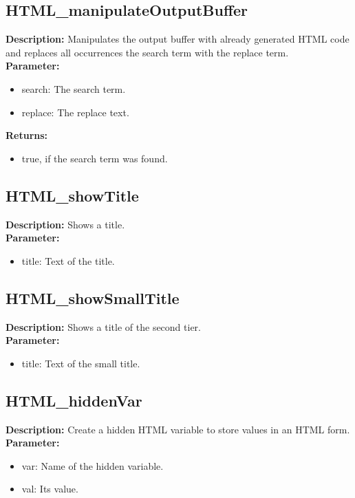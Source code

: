\subsection{HTML\_manipulateOutputBuffer}
\textbf{Description:} Manipulates the output buffer with already generated HTML code and replaces all occurrences the search term with the replace term.\\
\textbf{Parameter:}
\begin{itemize}
\item search: The search term.
\item replace: The replace text.
\end{itemize}
\textbf{Returns:}
\begin{itemize}
\item true, if the search term was found.
\end{itemize}

\subsection{HTML\_showTitle}
\textbf{Description:} Shows a title.\\
\textbf{Parameter:}
\begin{itemize}
\item title: Text of the title.
\end{itemize}

\subsection{HTML\_showSmallTitle}
\textbf{Description:} Shows a title of the second tier.\\
\textbf{Parameter:}
\begin{itemize}
\item title: Text of the small title.
\end{itemize}

\subsection{HTML\_hiddenVar}
\textbf{Description:} Create a hidden HTML variable to store values in an HTML form.\\
\textbf{Parameter:}
\begin{itemize}
\item var: Name of the hidden variable.
\item val: Its value.
\end{itemize}

